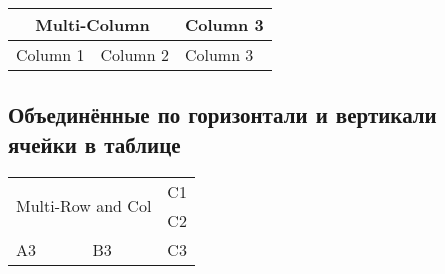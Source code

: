 \begin{tabular}{|l|l|l|}
    \hline
    \multicolumn{2}{|c|}{Multi-Column} & Column 3 \\
    \hline
    Column 1 & Column 2 & Column 3 \\
    \hline
\end{tabular} \label{table:merged_cells}

\subsection{Объединённые по горизонтали и вертикали ячейки в таблице}
\begin{tabular}{|l|l|l|}
    \hline
    \multicolumn{2}{|c|}{\multirow{2}{*}{Multi-Row and Col}} & C1 \\
    \cline{3-3}
    \multicolumn{2}{|c|}{} & C2 \\
    \hline
    A3 & B3 & C3 \\
    \hline
\end{tabular}
\clearpage